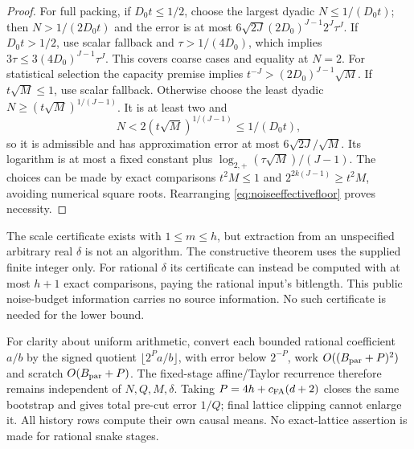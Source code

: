 \documentclass[11pt,letterpaper]{article}
\theoremstyle{definition}\newtheorem{definition}[theorem]{Definition}
\theoremstyle{remark}\newtheorem{remark}[theorem]{Remark}
\begin{document}
\begin{proof}
For full packing, if $D_0t\le1/2$, choose the largest dyadic $N\le1/(D_0t)$; then $N>1/(2D_0t)$ and the error is at most
$6\sqrt{2J}(2D_0)^{J-1}2^J\tau^J$.
If $D_0t>1/2$, use scalar fallback and $\tau>1/(4D_0)$, which implies $3\tau\le3(4D_0)^{J-1}\tau^J$. This covers coarse cases and equality at $N=2$.
For statistical selection the capacity premise implies
$t^{-J}>(2D_0)^{J-1}\sqrt M$. If $t\sqrt M\le1$, use scalar fallback. Otherwise choose the least dyadic $N\ge(t\sqrt M)^{1/(J-1)}$. It is at least two and
\[
 N<2(t\sqrt M)^{1/(J-1)}\le1/(D_0t),
\]
so it is admissible and has approximation error at most $6\sqrt{2J}/\sqrt M$. Its logarithm is at most a fixed constant plus $\log_{2,+}(\tau\sqrt M)/(J-1)$. The choices can be made by exact comparisons $t^2M\le1$ and $2^{2k(J-1)}\ge t^2M$, avoiding numerical square roots. Rearranging \eqref{eq:noiseeffectivefloor} proves necessity.
\end{proof}

The scale certificate exists with $1\le m\le h$, but extraction from an unspecified arbitrary real $\delta$ is not an algorithm. The constructive theorem uses the supplied finite integer only. For rational $\delta$ its certificate can instead be computed with at most $h+1$ exact comparisons, paying the rational input's bitlength. This public noise-budget information carries no source information. No such certificate is needed for the lower bound.

For clarity about uniform arithmetic, convert each bounded rational coefficient $a/b$ by the signed quotient $\lfloor2^Pa/b\rfloor$, with error below $2^{-P}$, work $O((B_{\rm par}+P)^2)$ and scratch $O(B_{\rm par}+P)$. The fixed-stage affine/Taylor recurrence therefore remains independent of $N,Q,M,\delta$. Taking $P=4h+c_{\rm FA}(d+2)$ closes the same bootstrap and gives total pre-cut error $1/Q$; final lattice clipping cannot enlarge it. All history rows compute their own causal means. No exact-lattice assertion is made for rational snake stages.
\end{document}
